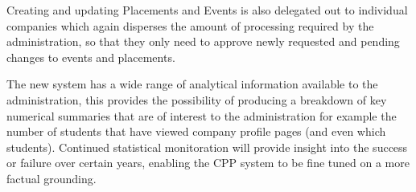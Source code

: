   Creating and updating Placements and Events is also delegated out to individual companies which again disperses the amount of processing required by the administration, so that they only need to approve newly requested and pending changes to events and placements.

  The new system has a wide range of analytical information available to the administration, this provides the possibility of producing a breakdown of key numerical summaries that are of interest to the administration for example the number of students that have viewed company profile pages (and even which students). Continued statistical monitoration will provide insight into the success or failure over certain years, enabling the CPP system to be fine tuned on a more factual grounding. 